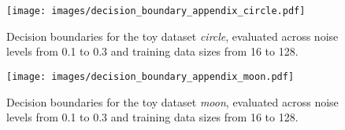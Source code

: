 








\begin{figure}[t]
    \centering
    \texttt{[image: images/decision\_boundary\_appendix\_circle.pdf]}
    \caption{Decision boundaries for the toy dataset \textit{circle}, evaluated across noise levels from 0.1 to 0.3 and training data sizes from 16 to 128.}
    \label{fig:decision_cir}
\end{figure}

\begin{figure}[t]
    \centering
    \texttt{[image: images/decision\_boundary\_appendix\_moon.pdf]}
    \caption{Decision boundaries for the toy dataset \textit{moon}, evaluated across noise levels from 0.1 to 0.3 and training data sizes from 16 to 128.}
    \label{fig:decision_moon}
\end{figure}

